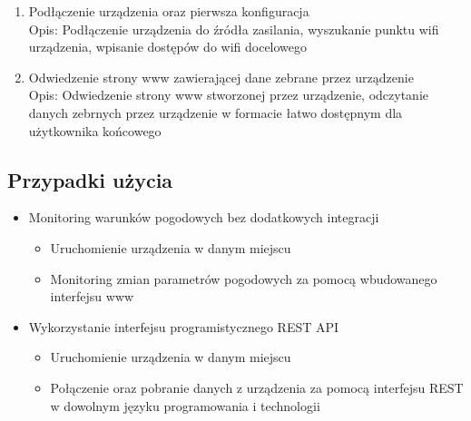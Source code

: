\documentclass[12pt,a4paper]{article}
\begin{document}
\begin{enumerate}
    \item Podłączenie urządzenia oraz pierwsza konfiguracja\\
    Opis: Podłączenie urządzenia do źródła zasilania, wyszukanie punktu wifi urządzenia, wpisanie dostępów do wifi docelowego
    \item Odwiedzenie strony www zawierającej dane zebrane przez urządzenie\\
    Opis: Odwiedzenie strony www stworzonej przez urządzenie, odczytanie danych zebrnych przez urządzenie w formacie łatwo dostępnym dla
    użytkownika końcowego
\end{enumerate}

\subsection{Przypadki użycia}

\begin{itemize}
    \item Monitoring warunków pogodowych bez dodatkowych integracji
    \begin{itemize}
        \item Uruchomienie urządzenia w danym miejscu
        \item Monitoring zmian parametrów pogodowych za pomocą wbudowanego interfejsu www
    \end{itemize}
    \item Wykorzystanie interfejsu programistycznego REST API
    \begin{itemize}
        \item Uruchomienie urządzenia w danym miejscu
        \item Połączenie oraz pobranie danych z urządzenia za pomocą interfejsu REST w dowolnym języku programowania i technologii
    \end{itemize}
\end{itemize}
\end{document}
